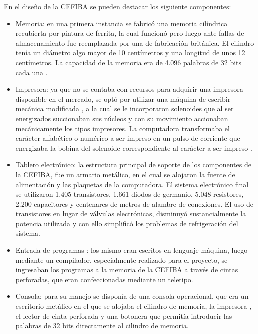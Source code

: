 \documentclass[%
 	final,
%
	notitlepage,
	narroweqnarray,
	inline,
 	twoside,
	]{ieee}
\begin{document}
En el dise\~no de la CEFIBA se pueden destacar los siguiente componentes:
\begin{itemize}
\item  Memoria: en una primera instancia se fabric\'o una memoria cil\'indrica recubierta por pintura de ferrita, la cual funcion\'o pero luego ante fallas de almacenamiento fue reemplazada por una de fabricaci\'on brit\'anica. El cilindro ten\'ia un di\'ametro algo mayor de 10 cent\'imetros y una longitud 
de unos 12 cent\'imetros. La capacidad de la memoria era de 4.096 palabras de 32 bits cada una .

\item Impresora: ya que no se contaba con recursos para adquirir una impresora disponible en el mercado, se opt\'o por utilizar una m\'aquina de escribir mec\'anica modificada , a la cual se le
incorporaron solenoides que al ser energizados succionaban sus n\'ucleos y con su movimiento accionaban mec\'anicamente los tipos impresores. La computadora transformaba el car\'acter alfab\'etico o num\'erico a ser impreso en un pulso de corriente que energizaba la bobina del solenoide correspondiente al car\'acter a ser impreso .

\item Tablero electr\'onico: la estructura principal de soporte de los componentes de la CEFIBA, fue un armario met\'alico, en el cual se alojaron la fuente de alimentaci\'on y las plaquetas de la computadora. El sistema electr\'onico final se utilizaron 1.405 transistores, 1.661 diodos de germanio, 5.048 resistores, 2.200 capacitores y centenares de metros de alambre de conexiones. El uso de transistores en lugar de v\'alvulas electr\'onicas, disminuy\'o sustancialmente la potencia utilizada y con 
ello simplific\'o los problemas de refrigeraci\'on del sistema.

\item Entrada de programas : los mismo eran escritos en lenguaje m\'aquina, luego mediante un compilador, especialmente realizado para el proyecto, se ingresaban los programas a la memoria de la CEFIBA a trav\'es de cintas perforadas, que eran confeccionadas mediante un teletipo.

\item Consola: para su manejo se dispon\'ia de una consola operacional, que era un escritorio met\'alico en el que se alojaba el cilindro de memoria, la impresora , el lector de cinta perforada y una botonera que permit\'ia introducir las palabras de 32 bits directamente al cilindro de memoria. 
\end{itemize}
\end{document}
